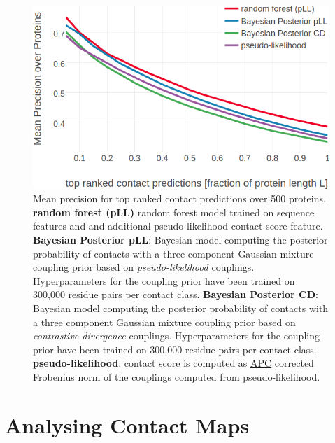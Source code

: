 \documentclass[11pt,a4paper,twoside]{book}
\theoremstyle{definition}
\theoremstyle{definition}
\theoremstyle{remark}
\begin{document}
\begin{figure}

{\centering \includegraphics[width=0.9\linewidth]{img/bayesian_model/benchmark/precision_vs_rank_pll_vs_cd_3comp_300k} 

}

\caption{Mean
precision for top ranked contact predictions over 500 proteins.
\textbf{random forest (pLL)} random forest model trained on sequence
features and and additional pseudo-likelihood contact score feature.
\textbf{Bayesian Posterior pLL}: Bayesian model computing the posterior
probability of contacts with a three component Gaussian mixture coupling
prior based on \emph{pseudo-likelihood} couplings. Hyperparameters for
the coupling prior have been trained on 300,000 residue pairs per
contact class. \textbf{Bayesian Posterior CD}: Bayesian model computing
the posterior probability of contacts with a three component Gaussian
mixture coupling prior based on \emph{contrastive divergence} couplings.
Hyperparameters for the coupling prior have been trained on 300,000
residue pairs per contact class. \textbf{pseudo-likelihood}: contact
score is computed as \protect\hyperlink{abbrev}{APC} corrected Frobenius
norm of the couplings computed from pseudo-likelihood.}\label{fig:precision-bayesian-model-pll-vs-cd-3comp-300k}
\end{figure}

\section{Analysing Contact Maps}\label{analysing-contact-maps}
\end{document}
